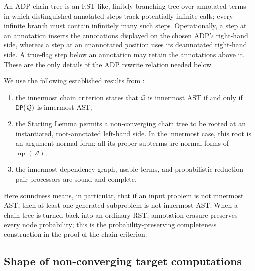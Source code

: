 An ADP chain tree is an RST-like, finitely branching tree over annotated terms
in which distinguished annotated steps track potentially infinite calls; every
infinite branch must contain infinitely many such steps.  Operationally, a step
at an annotation
inserts the annotations displayed on the chosen ADP's right-hand side, whereas
a step at an unannotated position uses its deannotated right-hand side.  A
true-flag step below an annotation may retain the annotations above it.  These
are the only details of the ADP rewrite relation needed below.

We use the following established results from
\cite{kassing_giesl_2026_adp}:
\begin{enumerate}
  \item the innermost chain criterion states that \(\mathcal Q\) is innermost
        AST if and only if \(\mathtt{DP}(\mathcal Q)\) is innermost AST;
  \item the Starting Lemma permits a non-converging chain tree to be rooted at
        an instantiated, root-annotated left-hand side.  In the innermost case,
        this root is an argument normal form: all its proper subterms are
        normal forms of \(\operatorname{np}(\mathcal A)\);
  \item the innermost dependency-graph, usable-terms, and probabilistic
        reduction-pair processors are sound and complete.
\end{enumerate}
Here soundness means, in particular, that if an input problem is not innermost
AST, then at least one generated subproblem is not innermost AST.  When a chain
tree is turned back into an ordinary RST, annotation erasure preserves every
node probability; this is the probability-preserving completeness construction
in the proof of the chain criterion.

\subsection{Shape of non-converging target computations}
\label{sec:target-shape}


